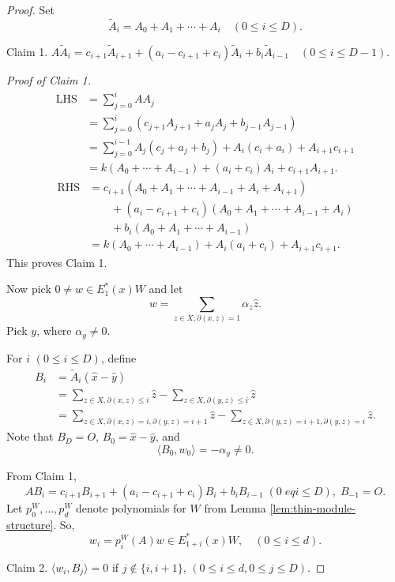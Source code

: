 \documentclass[
]{book}
\theoremstyle{definition}
\theoremstyle{definition}
\theoremstyle{definition}
\theoremstyle{definition}
\theoremstyle{remark}
\begin{document}
\begin{proof}
Set
\[\tilde{A}_i = A_0 + A_1 + \cdots + A_i \quad (0\leq i\leq D).\]

Claim 1. \(A\tilde{A}_i = c_{i+1}\tilde{A}_{i+1}+(a_i-c_{i+1}+c_i)\tilde{A}_i + b_i\tilde{A}_{i-1} \quad (0\leq i\leq D-1).\)

\emph{Proof of Claim 1.}
\begin{align}
\text{LHS} & = \sum_{j=0}^i AA_j\\
& = \sum_{j=0}^i (c_{j+1}A_{j+1} + a_jA_j + b_{j-1}A_{j-1})\\
& = \sum_{j=0}^{i-1}A_j(c_j+a_j+b_j) + A_i(c_i+a_i) + A_{i+1}c_{i+1}\\
& = k(A_0 + \cdots + A_{i-1}) + (a_i+c_i)A_i + c_{i+1}A_{i+1}.
\end{align}
\begin{align}
\text{RHS} & = c_{i+1}(A_0 + A_1 + \cdots + A_{i-1} + A_i + A_{i+1})\\
& \qquad + (a_i - c_{i+1}+c_i)(A_0 + A_1 + \cdots + A_{i-1} + A_i)\\
& \qquad + b_i(A_0 + A_1 + \cdots + A_{i-1})\\
& = k(A_0 + \cdots + A_{i-1}) + A_i(a_i + c_i) + A_{i+1}c_{i+1}.
\end{align}
This proves Claim 1.

Now pick \(0\neq w \in E^*_1(x)W\) and let
\[w = \sum_{z\in X, \partial(x,z)=1}\alpha_z\hat{z}.\]
Pick \(y\), where \(\alpha_y\neq 0\).

For \(i\) \((0\leq i\leq D)\), define
\begin{align}
B_i & = \tilde{A}_i(\hat{x}- \hat{y})\\
& = \sum_{z\in X, \partial(x,z)\leq i}\hat{z} - \sum_{z\in X, \partial(y,z)\leq i} \hat{z}\\
& = \sum_{z\in X, \partial(x,z)=i, \partial(y,z)=i+1}\hat{z} - \sum_{z\in X, \partial(y,z)=i+1, \partial(y,z)=i} \hat{z}.
\end{align}
Note that \(B_D = O\), \(B_0 = \hat{x}-\hat{y}\), and
\[\langle B_0, w_0\rangle = -\alpha_y \neq 0.\]

From Claim 1,
\[AB_i = c_{i+1}B_{i+1}+(a_i-c_{i+1}+c_i)B_i + b_iB_{i-1} \; (0\;eq i\leq D), \; B_{-1} = O.\]
Let \(p_0^W, \ldots, p^W_d\) denote polynomials for \(W\) from Lemma \ref{lem:thin-module-structure}. So,
\[w_i = p_i^W(A)w \in E^*_{1+i}(x)W, \quad (0\leq i\leq d).\]

Claim 2. \(\langle w_i, B_j \rangle = 0\) if \(j\not\in \{i, i+1\}\), \((0\leq i\leq d, 0\leq j\leq D)\).


\end{proof}
\end{document}

